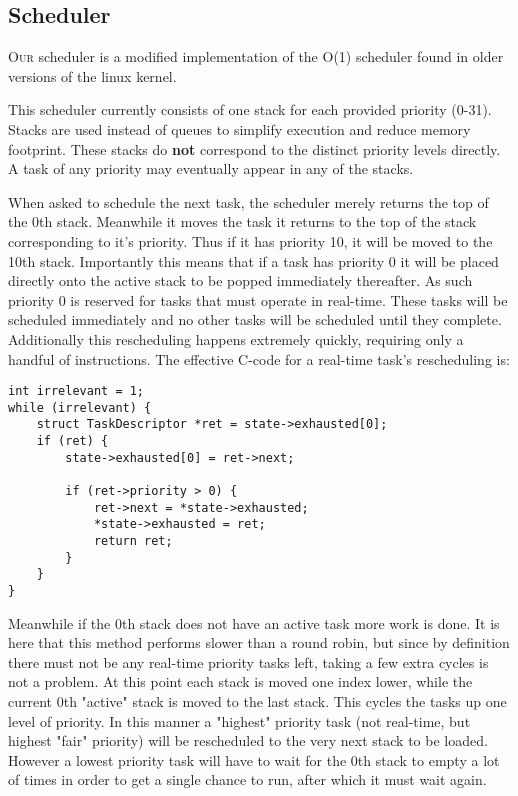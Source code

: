 \documentclass{article}
\begin{document}
\subsection*{Scheduler}

\textsc{Our} scheduler is a modified implementation of the O(1) scheduler found in older
versions of the linux kernel.

This scheduler currently consists of one stack for each provided priority
(0-31). Stacks are used instead of queues to simplify execution and reduce
memory footprint. These stacks do \textbf{not} correspond to the distinct
priority levels directly. A task of any priority may eventually appear in any of
the stacks.

When asked to schedule the next task, the scheduler merely returns the top of
the 0th stack. Meanwhile it moves the task it returns to the top of the stack
corresponding to it's priority. Thus if it has priority 10, it will be moved to
the 10th stack. Importantly this means that if a task has priority 0 it will be
placed directly onto the active stack to be popped immediately thereafter. As
such priority 0 is reserved for tasks that must operate in real-time. These
tasks will be scheduled immediately and no other tasks will be scheduled until
they complete. Additionally this rescheduling happens extremely quickly,
requiring only a handful of instructions. The effective C-code for a real-time
task's rescheduling is:

\begin{verbatim}
int irrelevant = 1;
while (irrelevant) {
	struct TaskDescriptor *ret = state->exhausted[0];
	if (ret) {
		state->exhausted[0] = ret->next;

		if (ret->priority > 0) {
			ret->next = *state->exhausted;
			*state->exhausted = ret;
			return ret;
		}
	}
}
\end{verbatim}

Meanwhile if the 0th stack does not have an active task more work is
done. It is here that this method performs slower than a round robin, but since
by definition there must not be any real-time priority tasks left, taking a few
extra cycles is not a problem. At this point each stack is moved one index
lower, while the current 0th "active" stack is moved to the last stack. This
cycles the tasks up one level of priority. In this manner a "highest" priority
task (not real-time, but highest "fair" priority) will be rescheduled to the
very next stack to be loaded. However a lowest priority task will have to wait
for the 0th stack to empty a lot of times in order to get a single chance to
run, after which it must wait again.
\end{document}
